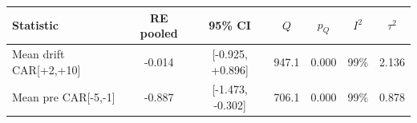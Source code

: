 \begin{tabular}{lcccccc}
\toprule
Statistic & RE pooled & 95\% CI & $Q$ & $p_Q$ & $I^2$ & $\tau^2$ \\
\midrule
Mean drift CAR[+2,+10] & -0.014 & [-0.925, +0.896] & 947.1 & 0.000 & 99\% & 2.136 \\
Mean pre CAR[-5,-1] & -0.887 & [-1.473, -0.302] & 706.1 & 0.000 & 99\% & 0.878 \\
\bottomrule
\end{tabular}
